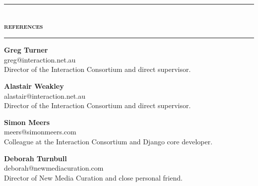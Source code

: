 \documentclass[a4paper,12pt]{article}
\begin{document}
\begin{spacing}{0.95}
\rule[1mm]{\linewidth}{1mm}\\
{\Large\textsc{\textbf{references}}}\\
\rule[1mm]{\linewidth}{1mm}

\vspace{2mm}
\begin{minipage}[t]{45mm}
	{\small%
		\textbf{\textsf{Greg Turner}}\\
		{\footnotesize{\condensed greg@interaction.net.au}}\\
		Director of the Interaction Consortium and direct supervisor.%
	}%
\end{minipage}%
\hspace{5mm}%
\begin{minipage}[t]{45mm}
	{\small%
		\textbf{\textsf{Alastair Weakley}}\\
		{\footnotesize{\condensed alastair@interaction.net.au}}\\
		Director of the Interaction Consortium and direct supervisor.%
	}%
\end{minipage}%
\hspace{5mm}%
\begin{minipage}[t]{45mm}
	{\small%
		\textbf{\textsf{Simon Meers}}\\
		{\footnotesize{\condensed meers@simonmeers.com}}\\
		Colleague at the Interaction Consortium and Django core developer.%
	}%
\end{minipage}%
\hspace{5mm}%
\begin{minipage}[t]{45mm}
	{\small%
		\textsf{\textbf{Deborah Turnbull}}\\
		{\footnotesize{\condensed deborah@newmediacuration.com}}\\
		Director of New Media Curation and close personal friend.%
	}%
\end{minipage}
\end{spacing}
\end{document}
